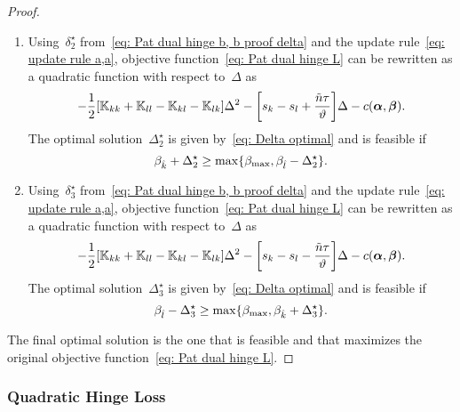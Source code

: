 \begin{proof}
\begin{enumerate}
    \item Using~$\delta^{\star}_2$ from~\eqref{eq: Pat dual hinge b, b proof delta} and the update rule~\eqref{eq: update rule a,a}, objective function~\eqref{eq: Pat dual hinge L} can be rewritten as a quadratic function with respect to~$\Delta$ as
    \begin{equation*}
      - \frac{1}{2} \Brac[s]{\K_{kk} + \K_{ll} - \K_{kl} - \K_{lk}} \Delta^2
      - \Brac[s]{s_k - s_l + \frac{\ntil \tau}{\vartheta}} \Delta
      - c(\bm{\alpha}, \bm{\beta}).
    \end{equation*}
    The optimal solution~$\Delta^{\star}_2$ is given by~\eqref{eq: Delta optimal} and is feasible if
    \begin{equation*}
      \beta_{\hat{k}} + \Delta^{\star}_2 \geq \max\{\beta_{\max} , \beta_{\hat{l}} - \Delta^{\star}_2\}.
    \end{equation*}

    \item Using~$\delta^{\star}_3$ from~\eqref{eq: Pat dual hinge b, b proof delta} and the update rule~\eqref{eq: update rule a,a}, objective function~\eqref{eq: Pat dual hinge L} can be rewritten as a quadratic function with respect to~$\Delta$ as
    \begin{equation*}
      - \frac{1}{2} \Brac[s]{\K_{kk} + \K_{ll} - \K_{kl} - \K_{lk}} \Delta^2
      - \Brac[s]{s_k - s_l - \frac{\ntil \tau}{\vartheta}} \Delta
      - c(\bm{\alpha}, \bm{\beta}).
    \end{equation*}
    The optimal solution~$\Delta^{\star}_3$ is given by~\eqref{eq: Delta optimal} and is feasible if
    \begin{equation*}
      \beta_{\hat{l}} - \Delta^{\star}_3 \geq \max\{\beta_{\max}, \beta_{\hat{k}} + \Delta^{\star}_3\}.
    \end{equation*}
  \end{enumerate}
  The final optimal solution is the one that is feasible and that maximizes the original objective function~\eqref{eq: Pat dual hinge L}.
\end{proof}

\subsubsection{Quadratic Hinge Loss}

